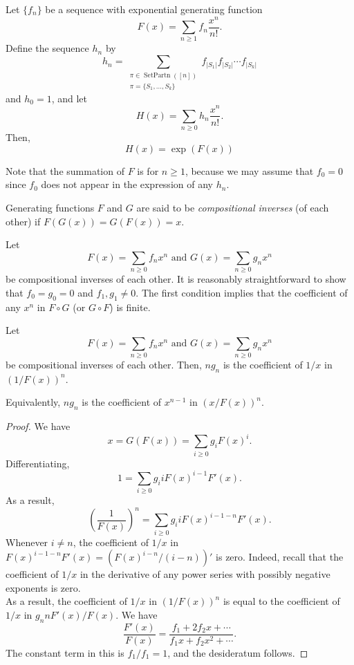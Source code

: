 	\begin{ftheo}
		\label{ec2: egf sum over partitions}
		Let $\{f_n\}$ be a sequence with exponential generating function
		\[ F(x) = \sum_{n \ge 1} f_n \frac{x^n}{n!}. \]
		Define the sequence $h_n$ by
		\[ h_n = \sum_{\substack{\pi \in \operatorname{SetPartn}([n]) \\ \pi = \{S_1,\ldots,S_k\}}} f_{|S_1|} f_{|S_2|} \cdots f_{|S_k|}  \]
		and $h_0 = 1$, and let
		\[ H(x) = \sum_{n \ge 0} h_n \frac{x^n}{n!}. \]
		Then,
		\[ H(x) = \exp(F(x)) \]
	\end{ftheo}
	Note that the summation of $F$ is for $n \ge 1$, because we may assume that $f_0 = 0$ since $f_0$ does not appear in the expression of any $h_n$.\\

	\begin{fdef}
		Generating functions $F$ and $G$ are said to be \emph{compositional inverses} (of each other) if $F(G(x)) = G(F(x)) = x$.
	\end{fdef}

	Let
	\[ F(x) = \sum_{n \ge 0} f_n x^n \text{ and } G(x) = \sum_{n \ge 0} g_n x^n \]
	be compositional inverses of each other. It is reasonably straightforward to show that $f_0 = g_0 = 0$ and $f_1,g_1 \ne 0$. The first condition implies that the coefficient of any $x^n$ in $F\circ G$ (or $G \circ F$) is finite. 

	\begin{ftheo}
		\label{theo: lagrange inversion}
		Let
		\[ F(x) = \sum_{n \ge 0} f_n x^n \text{ and } G(x) = \sum_{n \ge 0} g_n x^n \]
		be compositional inverses of each other. Then, $ng_n$ is the coefficient of $1/x$ in $(1/F(x))^n$.
	\end{ftheo}
	Equivalently, $ng_n$ is the coefficient of $x^{n-1}$ in $(x/F(x))^n$.
	\begin{proof}
		We have
		\[ x = G(F(x)) = \sum_{i \ge 0} g_i F(x)^i. \]
		Differentiating,
		\[ 1 = \sum_{i \ge 0} g_i i F(x)^{i-1} F'(x). \]
		As a result,
		\[ \left(\frac{1}{F(x)}\right)^n = \sum_{i \ge 0} g_i i F(x)^{i-1-n} F'(x).  \]
		Whenever $i \ne n$, the coefficient of $1/x$ in $F(x)^{i-1-n} F'(x) = \left(F(x)^{i-n}/(i-n)\right)'$ is zero. Indeed, recall that the coefficient of $1/x$ in the derivative of any power series with possibly negative exponents is zero.\\
		As a result, the coefficient of $1/x$ in $(1/F(x))^n$ is equal to the coefficient of $1/x$ in $g_n n F'(x) / F(x)$.
		We have
		\[ \frac{F'(x)}{F(x)} = \frac{f_1 + 2f_2x + \cdots}{f_1x + f_2x^2 + \cdots}. \]
		The constant term in this is $f_1/f_1 = 1$, and the desideratum follows. 
	\end{proof}

